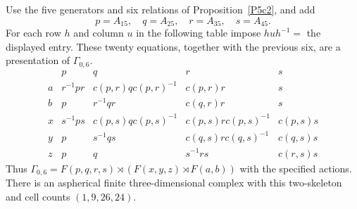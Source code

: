 \begin{proposition}\label{P5c3}
Use the five generators and six relations of
Proposition~\ref{P5c2}, and add
\[
 p=A_{15},\quad q=A_{25},\quad r=A_{35},\quad s=A_{45}.
\]
For each row $h$ and column $u$ in the following table impose
$huh^{-1}=$ the displayed entry.  These twenty equations,
together with the previous six, are a presentation of
$\Gamma_{0,6}$.
\[
\begin{array}{c|llll}
 &p&q&r&s\\ \hline
 a&r^{-1}pr&c(p,r)q c(p,r)^{-1}&c(p,r)r&s\\
 b&p&r^{-1}qr&c(q,r)r&s\\
 x&s^{-1}ps&c(p,s)q c(p,s)^{-1}&c(p,s)r c(p,s)^{-1}&c(p,s)s\\
 y&p&s^{-1}qs&c(q,s)r c(q,s)^{-1}&c(q,s)s\\
 z&p&q&s^{-1}rs&c(r,s)s
\end{array}
\]
Thus
$\Gamma_{0,6}=F(p,q,r,s)\rtimes
(F(x,y,z)\rtimes F(a,b))$ with the specified actions.
There is an aspherical finite three-dimensional complex with
this two-skeleton and cell counts $(1,9,26,24)$.
\end{proposition}

